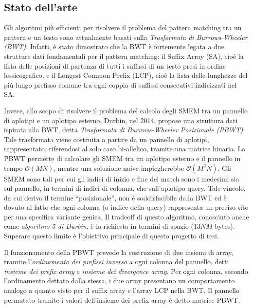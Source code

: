 \documentclass[a4paper,11pt, oneside,italian]{article}
\begin{document}
\subsection*{Stato dell'arte}

Gli algoritmi più efficienti per risolvere il problema del pattern matching tra
un pattern e un testo 
sono attualmente basati sulla \emph{Trasformata di Burrows-Wheeler (BWT)}.
Infatti, è stato dimostrato che la BWT è fortemente legata a due strutture dati
fondamentali per il pattern matching: 
il Suffix Array (SA), cioè la lista delle posizioni di partenza di
tutti i suffissi di un testo presi in ordine lessicografico, e il Longest Common
Prefix (LCP), cioè la lista delle lunghezze del più lungo prefisso comune tra
ogni coppia di suffissi consecutivi indicizzati nel SA. 

Invece, allo scopo di risolvere il problema del calcolo degli SMEM tra un
pannello di aplotipi e un aplotipo esterno,
Durbin, nel 2014, propose una struttura dati ispirata alla BWT, detta
\textit{Trasformata di Burrows-Wheeler Posizionale (PBWT)}. Tale trasformata
viene costruita a partire da un pannello di aplotipi, rappresentato, riferendosi
al solo caso bi-allelico, tramite una matrice binaria.
La PBWT permette di calcolare gli SMEM tra
un aplotipo esterno e il pannello in tempo $\mathcal{O}(MN)$, mentre 
una soluzione naive impiegherebbe $\mathcal{O}(M^2N)$. Gli SMEM sono tali per
cui gli indici di inizio 
e fine del match sono i medesimi sia sul pannello, in termini di indici di
colonna, che sull'aplotipo query. Tale
vincolo, da cui deriva il termine
``posizionale'', non è soddisfacibile dalla BWT ed è dovuto al fatto che ogni 
colonna (o indice della query) rappresenta un preciso sito per una specifica
variante genica. Il tradeoff di questo algoritmo, conosciuto anche come
\textit{algoritmo 5 di Durbin}, è la richiesta in termini di spazio ($13NM$
bytes). Superare questo limite è l'obiettivo principale di
questo progetto di tesi.

Il funzionamento della PBWT prevede la costruzione di due insiemi di
array, tramite 
l'\textit{ordinamento dei prefissi inverso} a ogni colonna del pannello, detti
\textit{insieme dei prefix array} e \textit{insieme dei divergence array}. Per
ogni colonna, secondo l'ordinamento dettato dalla stessa, i due array presentano
un comportamento analogo a quanto visto per il suffix array e l'array LCP nella
BWT. Il pannello permutato tramite i valori dell'insieme dei prefix array è
detto matrice PBWT.
\end{document}
